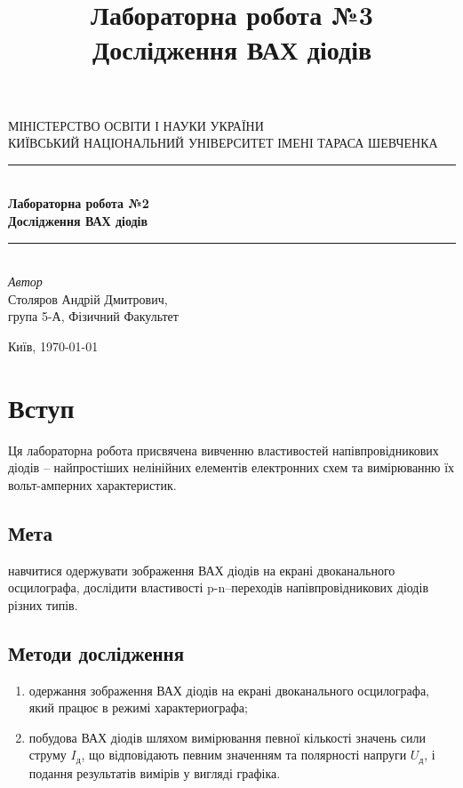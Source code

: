 \documentclass[
  ukrainian,
  14pt
]{extreport}
\author{}
\title{\Huge Лабораторна робота №3 \\\Large Дослідження ВАХ діодів}
\date{}
\begin{document}
\begin{titlepage} 
	\newcommand{\HRule}{\rule{\linewidth}{0.5mm}} 
	
	\center 
	
	\textsc{\Large МІНІСТЕРСТВО ОСВІТИ І НАУКИ УКРАЇНИ\\ \Large КИЇВСЬКИЙ НАЦІОНАЛЬНИЙ УНІВЕРСИТЕТ ІМЕНІ ТАРАСА ШЕВЧЕНКА}\\[1.5cm] 

	
	\HRule\\[0.4cm]
	
	{\huge \bfseries  Лабораторна робота №2 \\\Large \bfseries Дослідження ВАХ діодів
    }\\[0.4cm]
	
	\HRule\\[1.5cm]

	
	

	{\large\textit{Автор}}\\
	\large Столяров Андрій Дмитрович, \\\large група 5-А, Фізичний Факультет 
	
	
	\vfill\vfill\vfill 
	\vfill
	{\normalsize Київ, \today} 
\end{titlepage}
\tableofcontents
\clearpage
\section{Вступ}
Ця
 лабораторна
 робота
 присвячена
 вивченню
 властивостей
напівпровідникових діодів – найпростіших нелінійних елементів електронних
схем та вимірюванню їх вольт-амперних характеристик.

\subsection{Мета}
навчитися одержувати зображення ВАХ діодів на екрані
двоканального осцилографа,  дослідити
 властивості
 p-n–переходів
напівпровідникових діодів різних типів.

\subsection{Методи дослідження}
\begin{enumerate}
    \item одержання зображення ВАХ діодів на екрані
    двоканального осцилографа, який працює в режимі характериографа;
    \item побудова ВАХ діодів шляхом вимірювання певної кількості значень сили
    струму $I_{\text{д}}$, що відповідають певним значенням та полярності напруги $U_{\text{д}}$, і
    подання результатів вимірів у вигляді графіка.
\end{enumerate}
\end{document}
